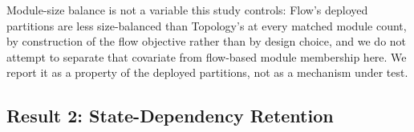 \documentclass[journal]{IEEEtran}
\theoremstyle{definition}
\begin{document}
%

Module-size balance is not a variable this study controls: Flow's deployed partitions are less size-balanced than Topology's at every matched module count, by construction of the flow objective rather than by design choice, and we do not attempt to separate that covariate from flow-based module membership here. We report it as a property of the deployed partitions, not as a mechanism under test.

\subsection{Result 2: State-Dependency Retention}
\label{sec:exp-psi-mi}
\end{document}
